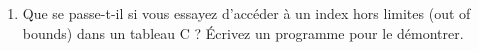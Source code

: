 \begin{enumerate}
	\item Que se passe-t-il si vous essayez d'accéder à un index hors limites (out of bounds) dans un tableau C ? Écrivez un programme pour le démontrer.
		
			
			
\end{enumerate}

